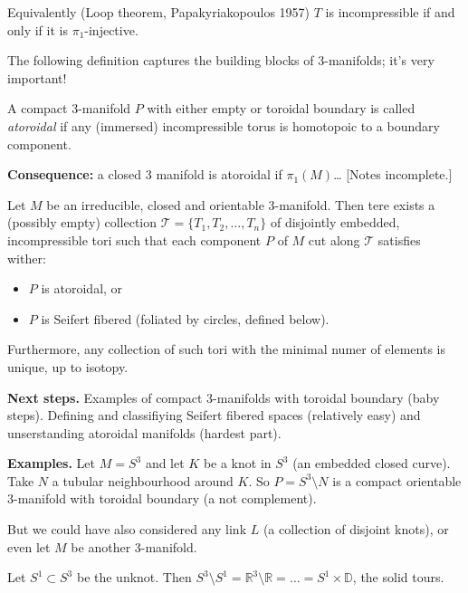 Equivalently (Loop theorem,
Papakyriakopoulos 1957) $T$ is
incompressible if and only if it is
$\pi_1$-injective.

\medskip\noindent
The following definition captures the
building blocks of 3-manifolds;
it's very important!

\begin{definition}[Atoroidal]
\label{definition-atoroidal}
A compact 3-manifold $P$ with either empty
or toroidal boundary is called
{\it atoroidal} if any (immersed)
incompressible torus is homotopoic to a
boundary component.
\end{definition}

\medskip\noindent
{\bf Consequence:} a closed 3 manifold is
atoroidal if $\pi_1(M)$…
[Notes incomplete.]

\begin{theorem}
\label{theorem-jsj-decompositionv1}
Let $M$ be an irreducible, closed and
orientable 3-manifold. Then tere exists a
(possibly empty) collection
$\mathcal{T}=\{T_1,T_2,…,T_n\}$ of
disjointly embedded, incompressible tori
such that each component $P$ of $M$ cut
along $\mathcal{T}$ satisfies wither:
\begin{itemize}
\item $P$ is atoroidal, or
\item  $P$ is Seifert fibered (foliated by
circles, defined below).
\end{itemize}
\noindent
Furthermore, any collection of such tori
with the minimal numer of elements is
unique, up to isotopy.
\end{theorem}

\medskip\noindent
{\bf Next steps.} 
Examples of compact 3-manifolds with
toroidal boundary (baby steps).
Defining and classifiying Seifert fibered
spaces (relatively easy) and unserstanding
atoroidal manifolds (hardest part).

\medskip\noindent
{\bf Examples.}
Let $M = S^3$ and let $K$ be a knot
in $S^3$ (an embedded closed curve).
Take $N$ a tubular neighbourhood around $K$.
So $P = S^3 \setminus N$ is a compact
orientable 3-manifold with toroidal boundary
(a not complement).

But we could have also considered any link
$L$ (a collection of disjoint knots),
or even let $M$ be another 3-manifold.

\begin{example}
\label{example-complement-unknot}
Let $S^1 \subset S^3$ be the unknot.
Then $S^3 \setminus S^1 =
\mathbb{R}^3\setminus\mathbb{R}=…=
S^1\times \mathbb{D}$,
the solid tours.
\end{example}

